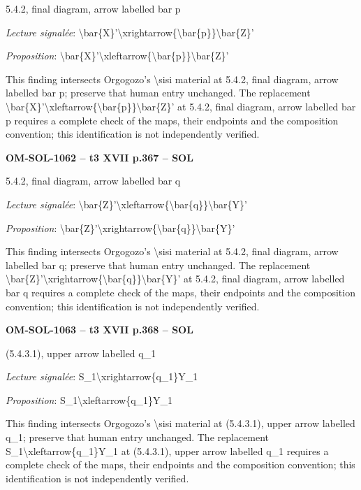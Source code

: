 5.4.2, final diagram, arrow labelled bar p\par
\emph{Lecture signalée}: \textbackslash{}bar\{X\}'\textbackslash{}xrightarrow\{\textbackslash{}bar\{p\}\}\textbackslash{}bar\{Z\}'\par
\emph{Proposition}: \textbackslash{}bar\{X\}'\textbackslash{}xleftarrow\{\textbackslash{}bar\{p\}\}\textbackslash{}bar\{Z\}'\par
This finding intersects Orgogozo's \textbackslash{}sisi material at 5.4.2, final diagram, arrow labelled bar p; preserve that human entry unchanged. The replacement \textbackslash{}bar\{X\}'\textbackslash{}xleftarrow\{\textbackslash{}bar\{p\}\}\textbackslash{}bar\{Z\}' at 5.4.2, final diagram, arrow labelled bar p requires a complete check of the maps, their endpoints and the composition convention; this identification is not independently verified.\par
\par\noindent\textbf{OM-SOL-1062 -- t3 XVII p.367 -- SOL}\par
5.4.2, final diagram, arrow labelled bar q\par
\emph{Lecture signalée}: \textbackslash{}bar\{Z\}'\textbackslash{}xleftarrow\{\textbackslash{}bar\{q\}\}\textbackslash{}bar\{Y\}'\par
\emph{Proposition}: \textbackslash{}bar\{Z\}'\textbackslash{}xrightarrow\{\textbackslash{}bar\{q\}\}\textbackslash{}bar\{Y\}'\par
This finding intersects Orgogozo's \textbackslash{}sisi material at 5.4.2, final diagram, arrow labelled bar q; preserve that human entry unchanged. The replacement \textbackslash{}bar\{Z\}'\textbackslash{}xrightarrow\{\textbackslash{}bar\{q\}\}\textbackslash{}bar\{Y\}' at 5.4.2, final diagram, arrow labelled bar q requires a complete check of the maps, their endpoints and the composition convention; this identification is not independently verified.\par
\par\noindent\textbf{OM-SOL-1063 -- t3 XVII p.368 -- SOL}\par
(5.4.3.1), upper arrow labelled q\_1\par
\emph{Lecture signalée}: S\_1\textbackslash{}xrightarrow\{q\_1\}Y\_1\par
\emph{Proposition}: S\_1\textbackslash{}xleftarrow\{q\_1\}Y\_1\par
This finding intersects Orgogozo's \textbackslash{}sisi material at (5.4.3.1), upper arrow labelled q\_1; preserve that human entry unchanged. The replacement S\_1\textbackslash{}xleftarrow\{q\_1\}Y\_1 at (5.4.3.1), upper arrow labelled q\_1 requires a complete check of the maps, their endpoints and the composition convention; this identification is not independently verified.\par
